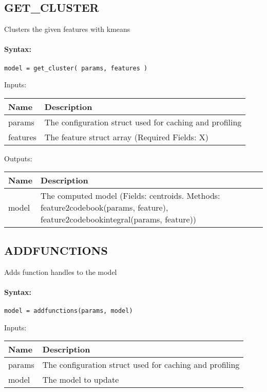 \subsection{GET\_CLUSTER}

Clusters the given features with kmeans

\paragraph{Syntax:} \verb|model = get_cluster( params, features )|

\bigskip
Inputs:

\begin{tabular}{|p{}|p{}|}
\hline
\textbf{Name} & \textbf{Description} \\
\hline \hline
params & The configuration struct used for caching and profiling  \\ \hline
features & The feature struct array (Required Fields: X)  \\ \hline
\end{tabular}

\bigskip
Outputs:

\begin{tabular}{|p{}|p{}|}
\hline
\textbf{Name} & \textbf{Description} \\
\hline \hline
model & The computed model (Fields: centroids. Methods: feature2codebook(params, feature), feature2codebookintegral(params, feature))  \\ \hline
\end{tabular}

\subsection{ADDFUNCTIONS}

Adds function handles to the model

\paragraph{Syntax:} \verb|model = addfunctions(params, model)|

\bigskip
Inputs:

\begin{tabular}{|p{}|p{}|}
\hline
\textbf{Name} & \textbf{Description} \\
\hline \hline
params & The configuration struct used for caching and profiling  \\ \hline
model & The model to update  \\ \hline
\end{tabular}

